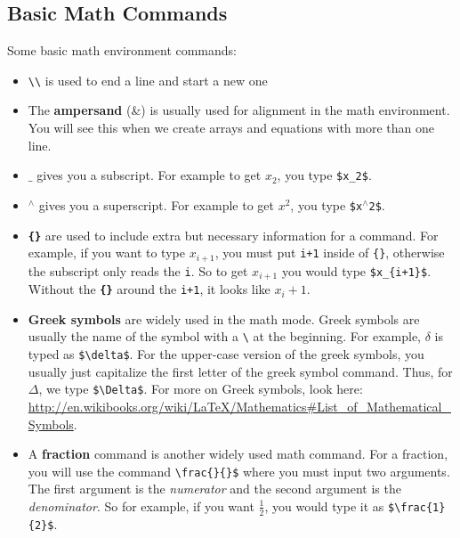 \documentclass[]{article}%
\newcommand{\bs}{\textbackslash}
\newcommand{\TT}[1]{\texttt{#1}}
\newcommand{\tpc}{\textperiodcentered}
\theoremstyle{definition}
\begin{document}
\subsection{Basic Math Commands}
Some basic math environment commands:
\begin{itemize}
	\item \TT{\bs\bs} is used to end a line and start a new one
	\item The \textbf{ampersand} (\&) is usually used for alignment in the math environment.
	You will see this when we create arrays and equations with more than one line.
	\item $\_$ gives you a subscript.
	For example to get $x_2$, you type \TT{\$x\_2\$}.
	\item $ ^\wedge $ gives you a superscript.
	For example to get $x^2$, you type \TT{\$x$^\wedge$2\$}.
	\item \textbf{\TT{\{\tpc\}}} are used to include extra but necessary information for a command.
	For example, if you want to type $x_{i+1}$, you must put \TT{i+1} inside of \TT{\{\tpc\}}, otherwise the subscript only reads the \TT{i}.
	So to get $x_{i+1}$ you would type \TT{\$x\_\{i+1\}\$}.
	Without the \textbf{\TT{\{\tpc\}}} around the \TT{i+1}, it looks like $x_i+1$.
	\item \textbf{Greek symbols} are widely used in the math mode.
	Greek symbols are usually the name of the symbol with a \TT{\bs} at the beginning.
	For example, $\delta$ is typed as \TT{\$\bs delta\$}.
	For the upper-case version of the greek symbols, you usually just capitalize the first letter of the greek symbol command.
	Thus, for $\Delta$, we type \TT{\$\bs Delta\$}.
	For more on Greek symbols, look here: \url{http://en.wikibooks.org/wiki/LaTeX/Mathematics#List_of_Mathematical_Symbols}.
	\item A \textbf{fraction} command is another widely used math command.
	For a fraction, you will use the command \TT{\bs frac\{\}\{\}\$} where you must input two arguments.
	The first argument is the \emph{numerator} and the second argument is the \emph{denominator}.
	So for example, if you want $\frac{1}{2}$, you would type it as \TT{\$\bs frac\{1\}\{2\}\$}.
\end{itemize}
%
\end{document}
